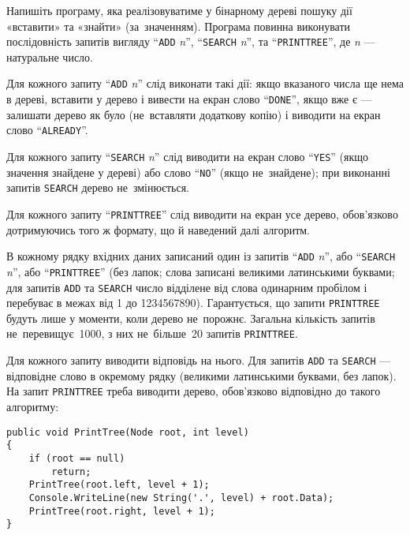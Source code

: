 ﻿Напишіть програму, яка реалізовуватиме у бінарному дереві пошуку дії «вставити» та «знайти» (за~значенням). Програма повинна виконувати  послідовність запитів вигляду ``{\tt ADD} {\it n}'', ``{\tt SEARCH} {\it n}'', та ``{\tt PRINTTREE}'', де {\it n} --- натуральне число.

Для кожного запиту ``{\tt ADD} {\it n}'' слід виконати такі дії: якщо вказаного числа ще нема в дереві, вставити у дерево і вивести на екран слово ``{\tt DONE}'', якщо вже є --- залишати дерево як було (не~вставляти додаткову копію) і виводити на екран слово ``{\tt ALREADY}''.

Для кожного запиту ``{\tt SEARCH} {\it n}'' слід виводити на екран слово ``{\tt YES}'' (якщо значення знайдене у дереві) або слово ``{\tt NO}'' (якщо не~знайдене); при виконанні запитів {\tt SEARCH} дерево не~змінюється.

Для кожного запиту ``{\tt PRINTTREE}'' слід виводити на екран усе дерево, обов’язково дотримуючись того ж формату, що й наведений далі алгоритм.

\InputFile
В кожному рядку вхідних даних записаний один із запитів ``{\tt ADD} {\it n}'', або ``{\tt SEARCH} {\it n}'', або ``{\tt PRINTTREE}'' (без лапок; слова записані великими латинськими буквами; для запитів {\tt ADD} та {\tt SEARCH} число відділене від слова одинарним пробілом і перебуває в межах від 1 до 1234567890). Гарантується, що запити {\tt PRINTTREE} будуть лише у моменти, коли дерево не~порожнє. Загальна кількість запитів не~перевищує~1000, з них не~більше~20 запитів {\tt PRINTTREE}.

\OutputFile
Для кожного запиту виводити відповідь на нього. Для запитів {\tt ADD} та {\tt SEARCH} --- відповідне слово в окремому рядку (великими латинськими буквами, без лапок). На запит {\tt  PRINTTREE} треба виводити дерево, обов’язково відповідно до такого алгоритму:

\begin{verbatim}
public void PrintTree(Node root, int level)
{
    if (root == null)
        return;
    PrintTree(root.left, level + 1);
    Console.WriteLine(new String('.', level) + root.Data);
    PrintTree(root.right, level + 1);
}
\end{verbatim}


